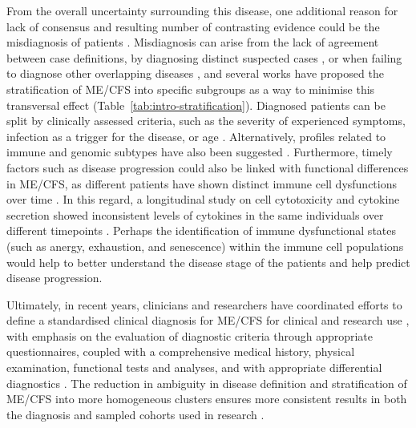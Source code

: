 From the overall uncertainty surrounding this disease, one additional reason for lack of consensus and resulting number of contrasting evidence could be the misdiagnosis of patients \citep{nacul2019HowHave}.
Misdiagnosis can arise from the lack of agreement between case definitions, by diagnosing distinct suspected cases \citep{nacul2017DifferingCase, malato2021Statisticalchallenges}, or when failing to diagnose other overlapping diseases \citep{nacul2019HowHave, malato2023ImpactMisdiagnosis}, and several works have proposed the stratification of ME/CFS into specific subgroups as a way to minimise this transversal effect (Table~\ref{tab:intro-stratification}).
Diagnosed patients can be split by clinically assessed criteria, such as the severity of experienced symptoms, infection as a trigger for the disease, or age \citep{janal2006SubtypingCFS, lewis2013ChronicFatigue, hardcastle2014AnalysisRelationship, domingues2021HerpesvirusesSerologya}.
Alternatively, profiles related to immune and genomic subtypes have also been suggested \citep{kerr2007SevenGenomic, kerr2008GeneExpression, vegaIntegrationDNAMethylation2018}.
Furthermore, timely factors such as disease progression could also be linked with functional differences in ME/CFS, as different patients have shown distinct immune cell dysfunctions over time \citep{maya2023SurveyingMetabolic}.
In this regard, a longitudinal study on cell cytotoxicity and cytokine secretion showed inconsistent levels of cytokines in the same individuals over different timepoints \citep{brenu2012LongitudinalInvestigation}.
Perhaps the identification of immune dysfunctional states (such as anergy, exhaustion, and senescence) within the immune cell populations would help to better understand the disease stage of the patients and help predict disease progression.

Ultimately, in recent years, clinicians and researchers have coordinated efforts to define a standardised clinical diagnosis for ME/CFS for clinical and research use \citep{nacul2021EuropeanNetwork}, with emphasis on the evaluation of diagnostic criteria through appropriate questionnaires, coupled with a comprehensive medical history, physical examination, functional tests and analyses, and with appropriate differential diagnostics \citep{pheby2020DevelopmentConsistent, steiner2023UnderstandingDiagnosing}. The reduction in ambiguity in disease definition and stratification of ME/CFS into more homogeneous clusters ensures more consistent results in both the diagnosis and sampled cohorts used in research \citep{scheibenbogen2017EuropeanME}.

